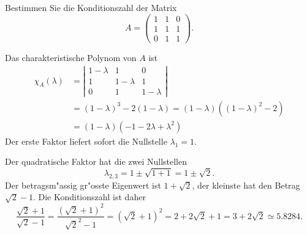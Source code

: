 Bestimmen Sie die Konditionszahl der Matrix
\[
A=\begin{pmatrix}
1&1&0\\
1&1&1\\
0&1&1
\end{pmatrix}.
\]

\begin{loesung}
Das charakteristische Polynom von $A$ ist
\begin{align*}
\chi_A(\lambda)
&=
\left|\begin{matrix}
1-\lambda&        1&        0\\
        1&1-\lambda&        1\\
        0&        1&1-\lambda
\end{matrix}\right|
\\
&=(1-\lambda)^3-2(1-\lambda)=(1-\lambda)((1-\lambda)^2-2)
\\
&=(1-\lambda)(-1-2\lambda+\lambda^2)
\end{align*}
Der erste Faktor liefert sofort die Nullstelle $\lambda_1=1$.

Der quadratische Faktor hat die zwei Nullstellen
\[
\lambda_{2,3}=1\pm\sqrt{1+1}=1\pm\sqrt{2}.
\]
Der betragsm"assig gr"osste Eigenwert ist $1+\sqrt{2}$, der kleinste
hat den Betrag $\sqrt{2}-1$.
Die Konditionszahl ist daher
\[
\frac{\sqrt{2}+1}{\sqrt{2}-1}
=
\frac{(\sqrt{2}+1)^2}{\sqrt{2}^2-1}=(\sqrt{2}+1)^2=2+2\sqrt{2}+1=3+2\sqrt{2}\simeq 5.8284.
\]
\end{loesung}


